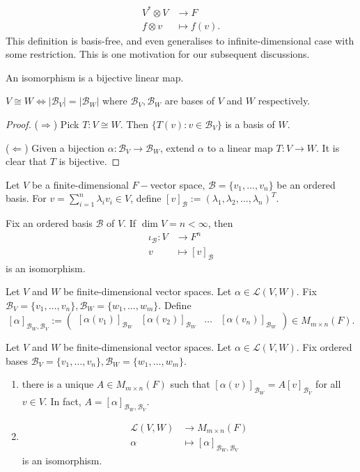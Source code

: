 \documentclass{scrartcl}
\def\L{\mathcal{L}}
\def\B{\mathcal{B}}
\begin{document}
\begin{align*}
	V^* \otimes V &\to F \\
	f \otimes v &\mapsto f(v).
\end{align*}
This definition is basis-free, and even generalises to infinite-dimensional case with some restriction. This is one motivation for our subsequent discussions. 
\begin{definition}
	An isomorphism is a bijective linear map. 
\end{definition}
\begin{lemma}
	$V \cong W \iff |\B_V| = |\B_W|$ where $\B_V, \B_W$ are bases of $V$ and $W$ respectively. 
\end{lemma}
\begin{proof}
	($\Rightarrow$) Pick $T: V \cong W$. Then $\{T(v): v \in \B_V\}$ is a basis of $W$. 
	\par ($\Leftarrow$) Given a bijection $\alpha: \B_V \to \B_W$, extend $\alpha$ to a linear map $T: V \to W$. It is clear that $T$ is bijective. 
\end{proof}
\begin{definition}
	Let $V$ be a finite-dimensional $F-$vector space, $\B = \{v_1, \dots, v_n\}$ be an ordered basis. For $v = \sum_{i=1}^n \lambda_i v_i \in V$, define $[v]_\B := (\lambda_1, \lambda_2, \dots, \lambda_n)^T$.
\end{definition}
\begin{lemma}
	Fix an ordered basis $\B$ of $V$. If $\dim{V} = n < \infty$, then
	\begin{align*}
		\iota_\B:V &\to F^n \\
		v &\mapsto [v]_\B
	\end{align*}
	is an isomorphism. 
\end{lemma}
\begin{definition}
	Let $V$ and $W$ be finite-dimensional vector spaces. Let $\alpha \in \L(V, W)$. Fix $\B_V = \{v_1, \dots, v_n\}, \B_W = \{w_1, \dots, w_m\}$. Define
	\[[\alpha]_{\B_W, \B_V} := 	\begin{pmatrix}
		[\alpha(v_1)]_{\B_W} & [\alpha(v_2)]_{\B_W} &\dots & [\alpha(v_n)]_{\B_W}
	\end{pmatrix} \in M_{m \times n}(F).\]
\end{definition}
\begin{lemma}
	Let $V$ and $W$ be finite-dimensional vector spaces. Let $\alpha \in \L(V, W)$. Fix ordered bases $\B_V = \{v_1, \dots, v_n\}, \B_W = \{w_1, \dots, w_m\}$.  
	\begin{enumerate}
		\item 	there is a unique $A \in M_{m \times n}(F)$ such that $[\alpha(v)]_{\B_W} = A[v]_{\B_V}$ for all $v \in V$. In fact, $A = [\alpha]_{\B_W, \B_V}$.
		\item 	\begin{align*}
			\L(V, W) &\to M_{m \times n}(F) \\
			\alpha &\mapsto [\alpha]_{\B_W, \B_V}
		\end{align*}
		is an isomorphism. 
	\end{enumerate}
\end{lemma}
\end{document}
